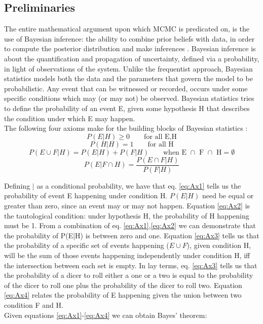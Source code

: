 \documentclass[letterpaper]{article}
\begin{document}
\subsection{Preliminaries}
The entire mathematical argument upon which MCMC is predicated on, is the use of Bayesian inference: the ability to combine prior beliefs with data, in order to compute the posterior distribution and make inferences \cite{tsay2002}. Bayesian inference is about the quantification and propagation of uncertainty, defined via a probability, in light of observations of the
system. Unlike the frequentist approach, Bayesian statistics models both the data and the parameters that govern the model to be probabilistic. 
Any event that can be witnessed or recorded, occurs under some specific conditions which may (or may not) be observed. Bayesian statistics tries to define the probability of an event E, given some hypothesis H that describes the condition under which E may happen.  \\
The following four axioms make for the building blocks of Bayesian statistics \cite{lee2012bayesian}:
\begin{equation}
P(E|H) \geq 0 \qquad \text{for all E,H}
\label{eq:Ax1} 
\end{equation}
\begin{equation}
P(H|H) = 1 \qquad \text{for all H}
\label{eq:Ax2}
\end{equation}
\begin{equation}
P(E \cup F |H) = P(E|H) + P(F|H) \qquad \text{when E $\cap$ F  $\cap$ H} = \emptyset 
\label{eq:Ax3} 
\end{equation}
\begin{equation}
P(E|F\cap H) = \frac{P(E \cap F|H)}{P(F|H)}
\label{eq:Ax4} 
\end{equation}

Defining $|$ as a conditional probability, we have that eq. \ref{eq:Ax1} tells us the probability of event E happening under condition H. $P(E|H)$ need be equal or greater than zero, since an event may or may not happen.
Equation \ref{eq:Ax2} is the tautological condition: under hypothesis H, the probability of H happening must be 1. From a combination of eq. \ref{eq:Ax1},\ref{eq:Ax2} we can demonstrate that the probability of P(E|H) is between zero and one. Equation \ref{eq:Ax3} tells us that the probability of a specific set of events happening ($E\cup F$), given condition H, will be the sum of those events happening independently under condition H, iff the intersection between each set is empty. In lay terms, eq. \ref{eq:Ax3} tells us that the probability of a dicer to roll either a one or a two is equal to the probability of the dicer to roll one plus the probability of the dicer to roll two. Equation \ref{eq:Ax4} relates the probability of E happening given the union between two condition F and H.\\ \newline
Given equations \ref{eq:Ax1}-\ref{eq:Ax4} we can obtain Bayes' theorem:
\end{document}
